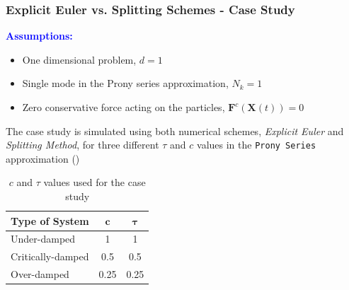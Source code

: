 \documentclass[a4paper,10pt]{beamer}
\newcommand{\BS}[1]{\boldsymbol{#1}}
\newcommand{\rb}[1]{\left( #1 \right)}
\begin{document}
	\begin{frame}
		\frametitle{Explicit Euler vs. Splitting Schemes - Case Study}
		\textcolor{blue}{\textbf{Assumptions:}}
		\begin{itemize}
			\item {One dimensional problem, $d = 1$}
			\item {Single mode in the Prony series approximation, $N_{k} = 1$}
			\item {Zero conservative force acting on the particles, $\BS{F}^{c}\rb{\BS{X}(t)} = 0$}
		\end{itemize}
		The case study is simulated using both numerical schemes, \textit{Explicit Euler} and \textit{Splitting Method}, for three different $\tau$ and $c$ values in the \texttt{Prony Series} approximation ()
		\begin{table}[H]
			\begin{tabular}{| p{2.6cm} | c | c |}
				\hline
				\textbf{Type of System} & $\BS{c}$ & $\BS{\tau}$ \\
				\hline
				Under-damped & 1 & 1 \\
				Critically-damped & 0.5 & 0.5 \\
				Over-damped & 0.25 & 0.25 \\
				\hline
			\end{tabular}
			\caption{$c$ and $\tau$ values used for the case study}
			\label{tab:cTauBaseCase}
		\end{table}
	\end{frame}
\end{document}
